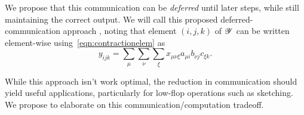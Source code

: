 We propose that this communication can be \emph{deferred} until later steps, while still maintaining the correct output. We will call this proposed deferred-communication approach \emph{\dTTM}, noting that element $(i,j,k)$ of $\T{Y}$
can be written element-wise using~\cref{eqn:contractionelem} as
\begin{equation}
  \label{eqn:elemwisemttm}
  y_{ijk} = \sum_\mu \sum_\nu \sum_\xi x_{\mu \nu \xi}a_{\mu i}b_{\nu j}c_{\xi k}.
\end{equation}

While this approach isn't work optimal, the reduction in communication should yield useful applications, particularly for low-flop operations such as sketching. We propose to elaborate on this communication/computation tradeoff.